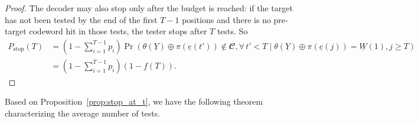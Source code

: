 \documentclass[letterpaper,draftclsnofoot,onecolumn]{IEEEtran}
\begin{document}
\begin{proof}
     The decoder may also stop only after the budget is reached: if the target has not been tested by the end of the first $T-1$ positions and there is no pre-target codeword hit in those tests, the tester stops after $T$ tests. So
     \begin{align}
        P_{\text{stop}}(T) & = \left(1 - \sum_{i=1}^{T-1} p_i \right) \Pr(\theta(\underline{Y})\oplus \pi(\underline{e}(t'))\notin \mathbfcal{C},\forall\, t'< T \mid \theta(\underline{Y})\oplus \pi(\underline{e}(j))=\underline{W}(1), j \geq T) \\
        &= \left(1 - \sum_{i=1}^{T-1} p_i \right)(1 - f(T)).
     \end{align}

\end{proof}

Based on Proposition~\ref{prop:stop_at_t}, we have the following theorem characterizing the average number of tests.
\end{document}
